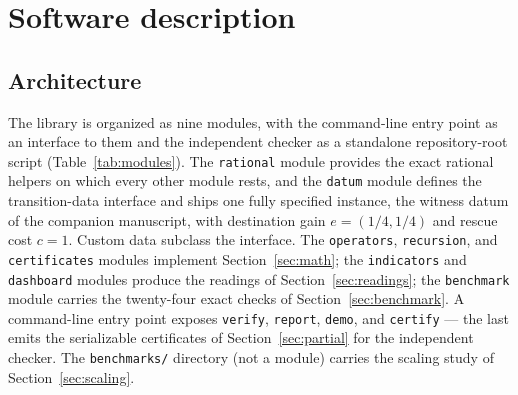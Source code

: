 \documentclass[11pt]{article}
\begin{document}
\section{Software description}\label{sec:software}

\subsection{Architecture}\label{sec:architecture}

The library is organized as nine modules, with the command-line
entry point as an interface to them and the independent checker as a
standalone repository-root script (Table~\ref{tab:modules}). The
\texttt{rational} module provides the exact rational helpers on which every
other module rests, and the \texttt{datum} module defines the transition-data interface and ships one
fully specified instance, the witness datum of the companion manuscript,
with destination gain $e = (1/4, 1/4)$ and rescue cost $c = 1$. Custom data
subclass the interface. The \texttt{operators}, \texttt{recursion}, and
\texttt{certificates} modules implement Section~\ref{sec:math}; the
\texttt{indicators} and \texttt{dashboard} modules produce the readings of
Section~\ref{sec:readings}; the \texttt{benchmark} module carries the
twenty-four exact checks of Section~\ref{sec:benchmark}. A command-line
entry point exposes \texttt{verify}, \texttt{report}, \texttt{demo}, and
\texttt{certify} --- the last emits the serializable certificates of
Section~\ref{sec:partial} for the independent checker. The
\texttt{benchmarks/} directory (not a module) carries the scaling study
of Section~\ref{sec:scaling}.
\end{document}
